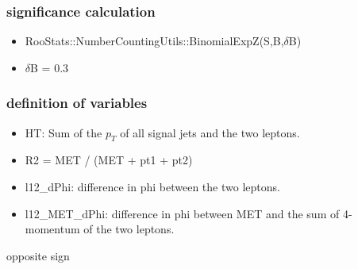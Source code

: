 \documentclass[mathserif,serif]{beamer}
\begin{document}
\begin{frame}
\frametitle{significance calculation}
\begin{itemize}
\item RooStats::NumberCountingUtils::BinomialExpZ(S,B,$\delta$B)
\item $\delta$B = 0.3
\end{itemize}
\end{frame}

\begin{frame}
\frametitle{definition of variables}
\normalsize
\begin{itemize}
\item HT: Sum of the $p_T$ of all signal jets and the two leptons.
\item R2 = MET / (MET + pt1 + pt2)
\item l12\_dPhi: difference in phi between the two leptons.
\item l12\_MET\_dPhi: difference in phi between MET and the sum of 4-momentum of the two leptons.
\end{itemize}
\end{frame}

\begin{frame}
\begin{center}
\huge
opposite sign
\end{center}
\end{frame}

\def \PathToPlot {../plot}
%
\end{document}
